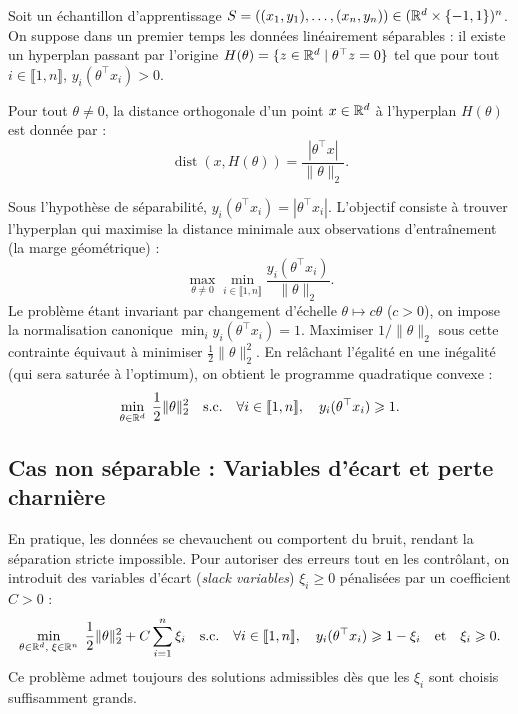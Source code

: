 Soit un échantillon d'apprentissage $S = ((x_1, y_1), \dots, (x_n, y_n)) \in (\mathbb{R}^d \times \{-1, 1\})^n$. On suppose dans un premier temps les données linéairement séparables : il existe un hyperplan passant par l'origine $H(\theta) = \{z \in \mathbb{R}^d \mid \theta^\top z = 0\}$ tel que pour tout $i \in \llbracket 1, n \rrbracket$, $y_i(\theta^\top x_i) > 0$.

\begin{proposition}
    Pour tout $\theta \neq 0$, la distance orthogonale d'un point $x \in \mathbb{R}^d$ à l'hyperplan $H(\theta)$ est donnée par :
    \begin{equation}
        \operatorname{dist}(x, H(\theta)) = \frac{|\theta^\top x|}{\|\theta\|_2}.
    \end{equation}
\end{proposition}

Sous l'hypothèse de séparabilité, $y_i(\theta^\top x_i) = |\theta^\top x_i|$. L'objectif consiste à trouver l'hyperplan qui maximise la distance minimale aux observations d'entraînement (la marge géométrique) :
\begin{equation}
    \max_{\theta \neq 0} \min_{i \in \llbracket 1, n \rrbracket} \frac{y_i(\theta^\top x_i)}{\|\theta\|_2}.
\end{equation}
Le problème étant invariant par changement d'échelle $\theta \mapsto c\theta$ ($c > 0$), on impose la normalisation canonique $\min_{i} y_i(\theta^\top x_i) = 1$. Maximiser $1/\|\theta\|_2$ sous cette contrainte équivaut à minimiser $\frac{1}{2}\|\theta\|_2^2$. En relâchant l'égalité en une inégalité (qui sera saturée à l'optimum), on obtient le programme quadratique convexe :
\begin{equation}
    \min_{\theta \in \mathbb{R}^d} \; \frac{1}{2} \|\theta\|_2^2 \quad \text{s.c.} \quad \forall i \in \llbracket 1, n \rrbracket, \quad y_i(\theta^\top x_i) \geqslant 1.
\end{equation}

\subsection{Cas non séparable : Variables d'écart et perte charnière}

En pratique, les données se chevauchent ou comportent du bruit, rendant la séparation stricte impossible. Pour autoriser des erreurs tout en les contrôlant, on introduit des variables d'écart (\emph{slack variables}) $\xi_i \geqslant 0$ pénalisées par un coefficient $C > 0$ :
\begin{equation}
    \min_{\theta \in \mathbb{R}^d, \; \xi \in \mathbb{R}^n} \; \frac{1}{2}\|\theta\|_2^2 + C \sum_{i=1}^n \xi_i \quad \text{s.c.} \quad \forall i \in \llbracket 1, n \rrbracket, \quad y_i(\theta^\top x_i) \geqslant 1 - \xi_i \quad \text{et} \quad \xi_i \geqslant 0.
\end{equation}
Ce problème admet toujours des solutions admissibles dès que les $\xi_i$ sont choisis suffisamment grands.

